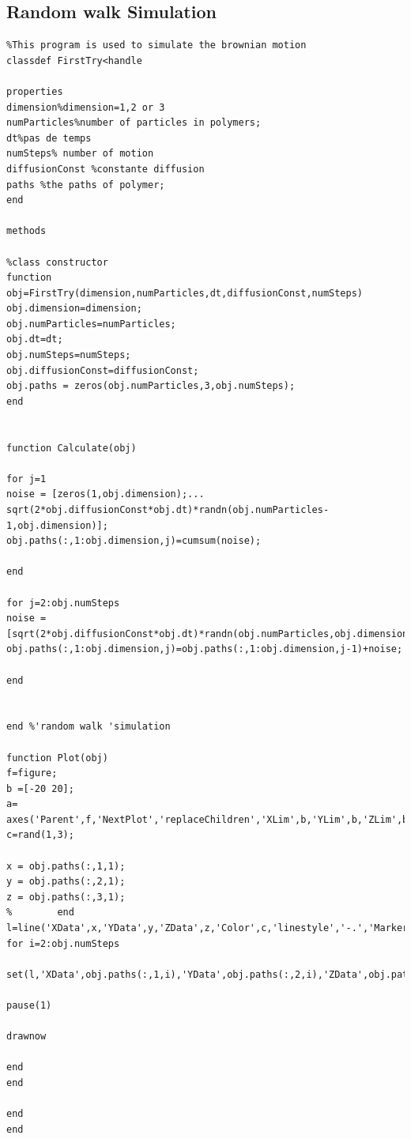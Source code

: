 \documentclass{article}
\begin{document}
\subsection{Random walk Simulation}
\begin{lstlisting}
%This program is used to simulate the brownian motion
classdef FirstTry<handle

properties
dimension%dimension=1,2 or 3
numParticles%number of particles in polymers;
dt%pas de temps
numSteps% number of motion
diffusionConst %constante diffusion
paths %the paths of polymer;
end

methods

%class constructor
function obj=FirstTry(dimension,numParticles,dt,diffusionConst,numSteps)
obj.dimension=dimension;
obj.numParticles=numParticles;
obj.dt=dt;
obj.numSteps=numSteps;
obj.diffusionConst=diffusionConst;
obj.paths = zeros(obj.numParticles,3,obj.numSteps);
end


function Calculate(obj)

for j=1
noise = [zeros(1,obj.dimension);...
sqrt(2*obj.diffusionConst*obj.dt)*randn(obj.numParticles-1,obj.dimension)];
obj.paths(:,1:obj.dimension,j)=cumsum(noise);

end

for j=2:obj.numSteps
noise = [sqrt(2*obj.diffusionConst*obj.dt)*randn(obj.numParticles,obj.dimension)];
obj.paths(:,1:obj.dimension,j)=obj.paths(:,1:obj.dimension,j-1)+noise;

end


end %'random walk 'simulation

function Plot(obj)
f=figure;
b =[-20 20];
a= axes('Parent',f,'NextPlot','replaceChildren','XLim',b,'YLim',b,'ZLim',b); 
c=rand(1,3);

x = obj.paths(:,1,1);
y = obj.paths(:,2,1);
z = obj.paths(:,3,1);
%        end
l=line('XData',x,'YData',y,'ZData',z,'Color',c,'linestyle','-.','Marker','o','markersize',10,'Parent',a);
for i=2:obj.numSteps

set(l,'XData',obj.paths(:,1,i),'YData',obj.paths(:,2,i),'ZData',obj.paths(:,3,i));

pause(1)

drawnow

end
end

end
end

\end{lstlisting}
\end{document}
